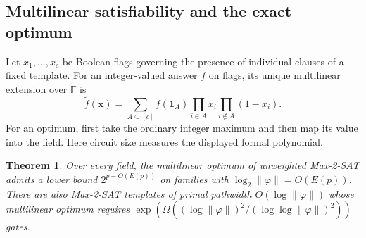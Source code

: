 \documentclass[11pt]{article}
\newtheorem{theorem}{Theorem}[section]
\theoremstyle{definition}
\newcommand{\F}{\mathbb F}
\begin{document}
\subsection{Multilinear satisfiability and the exact optimum}

Let \(x_1,\ldots,x_c\) be Boolean flags governing the presence of individual clauses of a fixed template. For an integer-valued answer \(f\) on flags, its unique multilinear extension over \(\F\) is
\[
 \widetilde f(\mathbf x)=\sum_{A\subseteq[c]} f(\mathbf1_A)
                 \prod_{i\in A}x_i\prod_{i\notin A}(1-x_i).
\]
For an optimum, first take the ordinary integer maximum and then map its value into the field. Here circuit size measures the displayed formal polynomial.

\begin{theorem}\label{thm:maxsat}
Over every field, the multilinear optimum of unweighted Max-2-SAT admits a lower bound \(2^{p-O(E(p))}\) on families with \(\log_2 \|\varphi\|=O(E(p))\). There are also Max-2-SAT templates of primal pathwidth \(O(\log \|\varphi\|)\) whose multilinear optimum requires \(\exp(\Omega((\log \|\varphi\|)^2/(\log\log \|\varphi\|)^2))\) gates.
\end{theorem}
\end{document}
